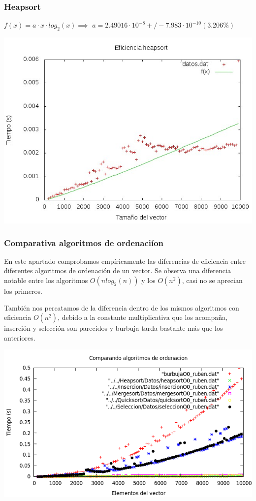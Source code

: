 \documentclass[11pt,spanish]{article} %
\begin{document}
\subsubsection{Heapsort}
$ f(x) = a\cdot x\cdot log_2(x) \implies$
$a               = 2.49016\cdot 10^{-8}      +/- 7.983\cdot 10^{-10}    (3.206\%)$
\begin{center}
\includegraphics[scale=0.55]{../Graficas/Heapsort/heapsortO0_ruben.jpeg}
\end{center}

\subsubsection{Comparativa algoritmos de ordenaci\'ion}

En este apartado comprobamos empíricamente las diferencias de eficiencia entre diferentes algoritmos de ordenación de un vector. Se observa una diferencia notable entre los algoritmos $O(nlog_2(n))$ y los $O(n^2)$, casi no se aprecian los primeros.

También nos percatamos de la diferencia dentro de los mismos algoritmos con eficiencia $O(n^2)$, debido a la constante multiplicativa que los acompaña, inserción y selección son parecidos y burbuja tarda bastante más que los anteriores.

\begin{center}
\includegraphics[scale=0.55]{../Graficas/todos.png}
\end{center}
\end{document}

